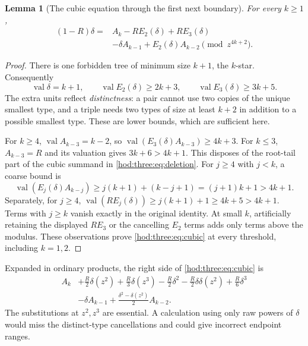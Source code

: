 \documentclass[11pt,letterpaper]{article}
\newtheorem{lemma}[theorem]{Lemma}
\theoremstyle{definition}\newtheorem{definition}[theorem]{Definition}
\theoremstyle{remark}\newtheorem{remark}[theorem]{Remark}
\newcommand{\val}{\operatorname{val}}
\begin{document}
\begin{lemma}[The cubic equation through the first next boundary]\label{hod:three:lem:cubic}
For every $k\ge1$,
\begin{equation}\label{hod:three:eq:cubic}
\begin{split}
(1-R)\delta={}&A_k-R E_2(\delta)+R E_3(\delta)\\
&-\delta A_{k-1}+E_2(\delta)A_{k-2}
\pmod {z^{4k+2}}.
\end{split}
\end{equation}
\end{lemma}
\begin{proof}
There is one forbidden tree of minimum size $k+1$, the $k$-star. Consequently
\begin{equation}\label{hod:three:eq:valuations}
\val\delta=k+1,\qquad \val E_2(\delta)\ge2k+3,\qquad
\val E_3(\delta)\ge3k+5.
\end{equation}
The extra units reflect \emph{distinctness}: a pair cannot use two copies of the unique smallest type, and a triple needs two types of size at least $k+2$ in addition to a possible smallest type. These are lower bounds, which are sufficient here.

For $k\ge4$, $\val A_{k-3}=k-2$, so
$\val(E_3(\delta)A_{k-3})\ge4k+3$. For $k\le3$, $A_{k-3}=R$ and its valuation gives $3k+6>4k+1$. This disposes of the root-tail part of the cubic summand in \eqref{hod:three:eq:deletion}. For $j\ge4$ with $j<k$, a coarse bound is
\[
\val(E_j(\delta)A_{k-j})\ge j(k+1)+(k-j+1)=(j+1)k+1>4k+1.
\]
Separately, for $j\ge4$, $\val(R E_j(\delta))\ge j(k+1)+1\ge4k+5>4k+1$. Terms with $j\ge k$ vanish exactly in the original identity. At small $k$, artificially retaining the displayed $R E_3$ or the cancelling $E_2$ terms adds only terms above the modulus. These observations prove \eqref{hod:three:eq:cubic} at every threshold, including $k=1,2$.
\end{proof}
Expanded in ordinary products, the right side of \eqref{hod:three:eq:cubic} is
\begin{equation}\label{hod:three:eq:cubicexpanded}
\begin{split}
A_k&+\frac R2\delta(z^2)+\frac R3\delta(z^3)-\frac R2\delta^2
-\frac R2\delta\delta(z^2)+\frac R6\delta^3\\
&-\delta A_{k-1}+\frac{\delta^2-\delta(z^2)}2A_{k-2}.
\end{split}
\end{equation}
The substitutions at $z^2,z^3$ are essential. A calculation using only raw powers of $\delta$ would miss the distinct-type cancellations and could give incorrect endpoint ranges.
\end{document}
